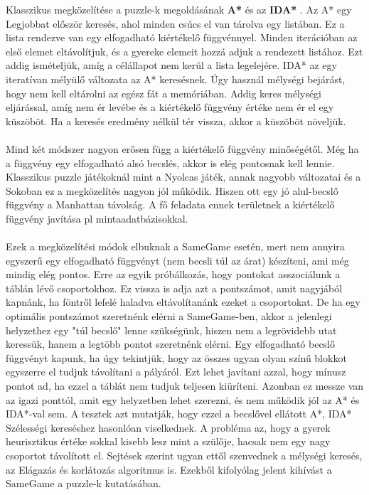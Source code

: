 \documentclass{article}
\begin{document}
	Klasszikus megközelítése a puzzle-k megoldásának \textbf{A*} \cite{hart1968formal} és az \textbf{IDA*} \cite{korf1985depth}. Az A* egy Legjobbat először keresés, ahol minden csúcs el van tárolva egy listában. Ez a lista rendezve van egy elfogadható kiértékelő függvénnyel. Minden iterációban az első elemet eltávolítjuk, és a gyereke elemeit hozzá adjuk a rendezett listához. Ezt addig ismételjük, amíg a célállapot nem kerül a lista legelejére. IDA* az egy iteratívan mélyülő változata az A* keresésnek. Úgy használ mélységi bejárást, hogy nem kell eltárolni az egész fát a memóriában. Addig keres mélységi eljárással, amíg nem ér levébe és a kiértékelő függvény értéke nem ér el egy küszöböt. Ha a keresés eredmény nélkül tér vissza, akkor a küszöböt növeljük.
	\\
	\\
	Mind két módszer nagyon erősen függ a kiértékelő függvény minőségétől. Még ha a függvény egy elfogadható alsó becslés, akkor is elég pontosnak kell lennie. Klasszikus puzzle játékoknál mint a Nyolcas játék, annak nagyobb változatai \cite{korf1985depth}  és a Sokoban \cite{junghanns2000pushing} ez a megközelítés nagyon jól működik. Hiszen ott egy jó alul-becslő függvény a Manhattan távolság. A fő feladata ennek területnek a kiértékelő függvény javítása pl mintaadatbázisokkal. \cite{felner2005dual} \cite{culberson1998pattern}
	\\
	\\
	Ezek a megközelítési módok elbuknak a SameGame esetén, mert nem annyira egyszerű egy elfogadható függvényt (nem becsli túl az árat) készíteni, ami még mindig elég pontos. Erre az egyik próbálkozás, hogy pontokat asszociálunk a táblán lévő csoportokhoz. Ez vissza is adja azt a pontszámot, amit nagyjából kapnánk, ha föntről lefelé haladva eltávolítanánk ezeket a csoportokat. De ha egy optimális pontszámot szeretnénk elérni a SameGame-ben, akkor a jelenlegi helyzethez egy "túl becslő" lenne szükségünk, hiszen nem a legrövidebb utat keressük, hanem a legtöbb pontot szeretnénk elérni. Egy elfogadható becslő függvényt kapunk, ha úgy tekintjük, hogy az összes ugyan olyan színű blokkot egyszerre el tudjuk távolítani a pályáról. Ezt lehet javítani azzal, hogy mínusz pontot ad, ha ezzel a táblát nem tudjuk teljesen kiüríteni. Azonban ez messze van az igazi ponttól, amit egy helyzetben lehet szerezni, és nem működik jól az A* és IDA*-val sem. A tesztek azt mutatják, hogy ezzel a becslővel ellátott A*, IDA* Szélességi kereséshez hasonlóan viselkednek.\cite{schadd2012single} A probléma az, hogy a gyerek heurisztikus értéke sokkal kisebb lesz mint a szülője, hacsak nem egy nagy csoportot távolított el. Sejtések szerint ugyan ettől szenvednek a mélységi keresés, az Elágazás és korlátozás algoritmus is. \cite{vempaty1991depth} Ezekből kifolyólag jelent kihívást a SameGame a puzzle-k kutatásában.
	
\end{document}
